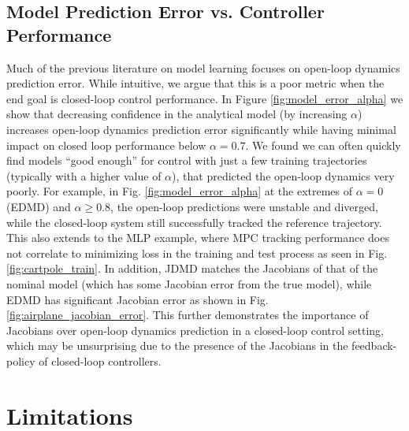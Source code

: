 \documentclass[../root.tex]{subfiles}
\newcommand{\changed}[1]{{\color{black} #1}}
\begin{document}
\changed{
\subsection{Model Prediction Error vs. Controller Performance}

Much of the previous literature on model learning focuses on open-loop dynamics prediction error. While 
intuitive, we argue that this is a poor metric when the end goal is closed-loop control performance. In Figure
\ref{fig:model_error_alpha} we show that decreasing confidence in the analytical model (by increasing $\alpha$)
increases open-loop dynamics prediction error significantly while having minimal impact on closed loop performance below $\alpha = 0.7$. We found we can often quickly find models ``good enough'' for control with just a few training trajectories (typically with a higher value of $\alpha$), that predicted the open-loop dynamics very poorly. For example, in Fig. \ref{fig:model_error_alpha} at the extremes of $\alpha = 0$ (EDMD) and 
$\alpha \geq 0.8$, the open-loop predictions were unstable and diverged, while the closed-loop system still 
successfully tracked the reference trajectory. This also extends to the MLP example, where MPC tracking performance does not correlate to minimizing loss in the training and test process as seen in Fig. \ref{fig:cartpole_train}. In addition, JDMD matches the Jacobians of that of the nominal model (which has some Jacobian error from the true model), while EDMD has significant Jacobian error as shown in Fig. \ref{fig:airplane_jacobian_error}. This further demonstrates the importance of Jacobians over open-loop dynamics prediction in a closed-loop control setting, which may be unsurprising due to the presence of the Jacobians in the feedback-policy of closed-loop controllers. 
}

\section{Limitations} \label{sec:limitations}
\end{document}
